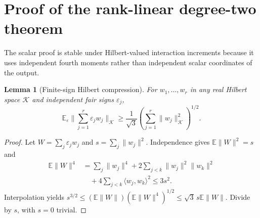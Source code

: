 \documentclass[11pt,letterpaper]{article}
\newtheorem{lemma}[theorem]{Lemma}
\theoremstyle{definition}
\newcommand{\E}{\mathbb E}
\newcommand{\cK}{\mathcal K}
\newcommand{\norm}[1]{\lVert #1\rVert}
\begin{document}
\section{Proof of the rank-linear degree-two theorem}\label{sec:rank}
The scalar proof is stable under Hilbert-valued interaction increments because it uses independent fourth moments rather than independent scalar coordinates of the output.

\begin{lemma}[Finite-sign Hilbert compression]\label{lem:sign}
For $w_1,\ldots,w_r$ in any real Hilbert space $\cK$ and independent fair signs $\varepsilon_j$,
\begin{equation}\label{eq:sign}
\E_\varepsilon\norm{\sum_{j=1}^r\varepsilon_jw_j}_{\cK}
\ge\frac{1}{\sqrt3}\left(\sum_{j=1}^r\norm{w_j}_{\cK}^2\right)^{1/2}.
\end{equation}
\end{lemma}
\begin{proof}
Let $W=\sum_j\varepsilon_jw_j$ and $s=\sum_j\norm{w_j}^2$. Independence gives $\E\norm W^2=s$ and
\[\begin{aligned}
\E\norm W^4&=\sum_j\norm{w_j}^4+2\sum_{j<k}\norm{w_j}^2\norm{w_k}^2\\
&\quad+4\sum_{j<k}\langle w_j,w_k\rangle^2\le3s^2.
\end{aligned}\]
Interpolation yields $s^{3/2}\le(\E\norm W)(\E\norm W^4)^{1/2}\le\sqrt3\,s\E\norm W$. Divide by $s$, with $s=0$ trivial.
\end{proof}
\end{document}
